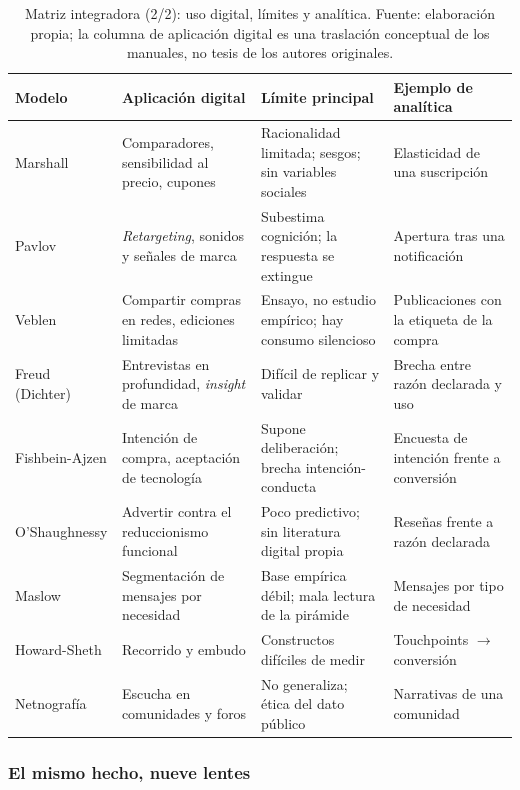 \begin{table}[!htb]
\centering
\scriptsize
\begin{tabular}{@{}>{\raggedright}p{2.0cm}>{\raggedright}p{3.4cm}>{\raggedright}p{3.4cm}>{\raggedright\arraybackslash}p{3.0cm}@{}}
\toprule
Modelo & Aplicación digital & Límite principal & Ejemplo de analítica \\
\midrule
Marshall & Comparadores, sensibilidad al precio, cupones & Racionalidad limitada; sesgos; sin variables sociales & Elasticidad de una suscripción \\
Pavlov & \textit{Retargeting}, sonidos y señales de marca & Subestima cognición; la respuesta se extingue & Apertura tras una notificación \\
Veblen & Compartir compras en redes, ediciones limitadas & Ensayo, no estudio empírico; hay consumo silencioso & Publicaciones con la etiqueta de la compra \\
Freud (Dichter) & Entrevistas en profundidad, \textit{insight} de marca & Difícil de replicar y validar & Brecha entre razón declarada y uso \\
Fishbein-Ajzen & Intención de compra, aceptación de tecnología & Supone deliberación; brecha intención-conducta & Encuesta de intención frente a conversión \\
O'Shaughnessy & Advertir contra el reduccionismo funcional & Poco predictivo; sin literatura digital propia & Reseñas frente a razón declarada \\
Maslow & Segmentación de mensajes por necesidad & Base empírica débil; mala lectura de la pirámide & Mensajes por tipo de necesidad \\
Howard-Sheth & Recorrido y embudo & Constructos difíciles de medir & Touchpoints $\rightarrow$ conversión \\
Netnografía & Escucha en comunidades y foros & No generaliza; ética del dato público & Narrativas de una comunidad \\
\bottomrule
\end{tabular}
\caption{Matriz integradora (2/2): uso digital, límites y analítica. Fuente:
elaboración propia; la columna de aplicación digital es una traslación
conceptual de los manuales, no tesis de los autores originales.}
\label{tab:cap09-matriz2}
\end{table}

\subsubsection{El mismo hecho, nueve lentes}

